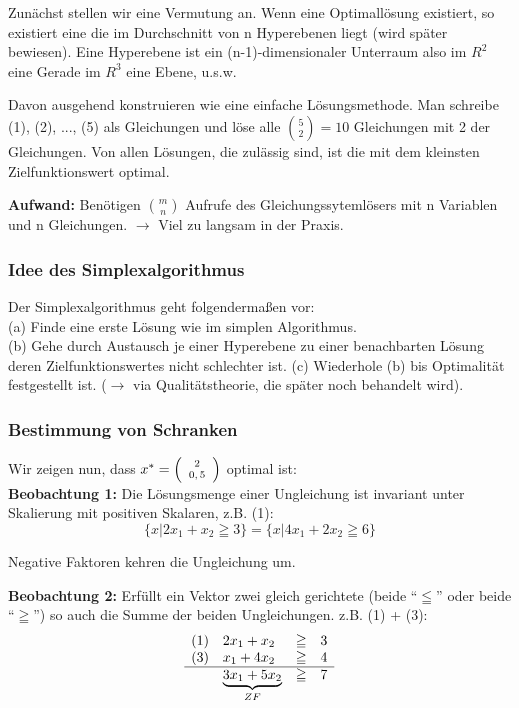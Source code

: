 \documentclass[12pt,titlepage,a4paper] {report}
\begin{document}
Zunächst stellen wir eine Vermutung an. Wenn eine Optimallösung
existiert, so existiert eine die im Durchschnitt von n Hyperebenen liegt
(wird später bewiesen). Eine Hyperebene ist ein (n-1)-dimensionaler
Unterraum also im $R^{2}$ eine Gerade im $R^{3}$ eine Ebene, u.s.w.

Davon ausgehend konstruieren wie eine einfache Lösungsmethode. Man
schreibe (1), (2), ..., (5) als Gleichungen und löse alle ${5\choose 2}
= 10$ Gleichungen mit 2 der Gleichungen. Von allen Lösungen, die
zulässig sind, ist die mit dem kleinsten Zielfunktionswert optimal.

{\bf Aufwand:} Benötigen ${m\choose n}$ Aufrufe des Gleichungssytemlösers mit
n Variablen und n Gleichungen. $\rightarrow$ Viel zu langsam in der
Praxis.

\subsubsection{Idee des Simplexalgorithmus}

Der Simplexalgorithmus geht folgendermaßen vor:\\
(a) Finde eine erste Lösung wie im simplen Algorithmus.\\
(b) Gehe durch Austausch je einer Hyperebene zu einer benachbarten
Lösung deren Zielfunktionswertes nicht schlechter ist.
(c) Wiederhole (b) bis Optimalität festgestellt ist. ($\rightarrow$ via
Qualitätstheorie, die später noch behandelt wird).

\subsubsection{Bestimmung von Schranken}

Wir zeigen nun, dass $x^{*} =
{\scriptsize\left(\begin{array}{c}2\\0,5\end{array}\right)}$ optimal
ist:\\
{\bf Beobachtung 1:} Die Lösungsmenge einer Ungleichung ist invariant
unter Skalierung mit positiven Skalaren, z.B. (1):
\[\{x|2x_{1}+x_{2} \geqq 3\} = \{x|4x_{1}+2x_{2} \geqq 6\}\]

Negative Faktoren kehren die Ungleichung um.

{\bf Beobachtung 2:} Erfüllt ein Vektor zwei gleich gerichtete (beide
"`$\leqq$"' oder beide "`$\geqq$"') so auch die Summe der beiden
Ungleichungen. z.B. (1) + (3):
\[\begin{array}{llcl}
(1)&2x_{1}+x_{2} &\geqq& 3\\
(3)&x_{1}+4x_{2}&\geqq&4\\
\hline
&\underbrace{3x_{1} + 5x_{2}}_{ZF}&\geqq& 7
\end{array}\] 
\end{document}
